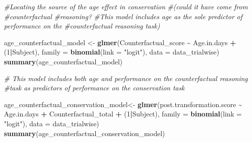 \documentclass[
  doc]{apa6}
\newenvironment{Shaded}{\begin{snugshade}}{\end{snugshade}}
\newcommand{\AttributeTok}[1]{\textcolor[rgb]{0.13,0.29,0.53}{#1}}
\newcommand{\CommentTok}[1]{\textcolor[rgb]{0.56,0.35,0.01}{\textit{#1}}}
\newcommand{\DecValTok}[1]{\textcolor[rgb]{0.00,0.00,0.81}{#1}}
\newcommand{\FunctionTok}[1]{\textcolor[rgb]{0.13,0.29,0.53}{\textbf{#1}}}
\newcommand{\NormalTok}[1]{#1}
\newcommand{\OtherTok}[1]{\textcolor[rgb]{0.56,0.35,0.01}{#1}}
\newcommand{\SpecialCharTok}[1]{\textcolor[rgb]{0.81,0.36,0.00}{\textbf{#1}}}
\newcommand{\StringTok}[1]{\textcolor[rgb]{0.31,0.60,0.02}{#1}}
\begin{document}
\begin{Shaded}
\begin{Highlighting}[]
\CommentTok{\#Locating the source of the age effect in conservation }
\CommentTok{\#(could it have come from \#counterfactual \#reasoning? }
\CommentTok{\#This model includes age as the sole predictor of performance on the }
\CommentTok{\#counterfactual reasoning task)}

\NormalTok{age\_counterfactual\_model }\OtherTok{\textless{}{-}} \FunctionTok{glmer}\NormalTok{(Counterfactual\_score }\SpecialCharTok{\textasciitilde{}}\NormalTok{ Age.in.days }\SpecialCharTok{+} 
\NormalTok{                                    (}\DecValTok{1}\SpecialCharTok{|}\NormalTok{Subject),}
                \AttributeTok{family =} \FunctionTok{binomial}\NormalTok{(}\AttributeTok{link =} \StringTok{"logit"}\NormalTok{),}
                \AttributeTok{data =}\NormalTok{ data\_trialwise)}
\FunctionTok{summary}\NormalTok{(age\_counterfactual\_model)}
\end{Highlighting}
\end{Shaded}

\begin{Shaded}
\begin{Highlighting}[]
\CommentTok{\# This model includes both age and performance on the counterfactual reasoning }
\CommentTok{\#task as predictors of performance on the conservation task}

\NormalTok{age\_counterfactual\_conservation\_model}\OtherTok{\textless{}{-}} \FunctionTok{glmer}\NormalTok{(post.transformation.score }\SpecialCharTok{\textasciitilde{}} 
\NormalTok{                                                Age.in.days }\SpecialCharTok{+} 
\NormalTok{                                                Counterfactual\_total }\SpecialCharTok{+}
\NormalTok{                  (}\DecValTok{1}\SpecialCharTok{|}\NormalTok{Subject), }
                  \AttributeTok{family =} \FunctionTok{binomial}\NormalTok{(}\AttributeTok{link =} \StringTok{"logit"}\NormalTok{),}
                \AttributeTok{data =}\NormalTok{ data\_trialwise)}
\FunctionTok{summary}\NormalTok{(age\_counterfactual\_conservation\_model)}
\end{Highlighting}
\end{Shaded}
\end{document}
